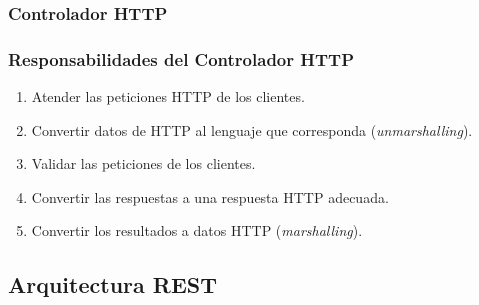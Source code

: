 \documentclass[a4paper,slidestop,xcolor=pst,blue]{beamer}
\begin{document}
\begin{frame}
    \frametitle{Controlador HTTP}
\end{frame}

\begin{frame}[c]
	\frametitle{Responsabilidades del Controlador HTTP}
	\begin{enumerate}[<+->]
        \item Atender las peticiones HTTP de los clientes.
        \item Convertir datos de HTTP al lenguaje que corresponda (\emph{unmarshalling}).
        \item Validar las peticiones de los clientes.
        \item Convertir las respuestas a una respuesta HTTP adecuada.
        \item Convertir los resultados a datos HTTP (\emph{marshalling}).
	\end{enumerate}
\end{frame}

\subsection{Arquitectura REST}
\end{document}
